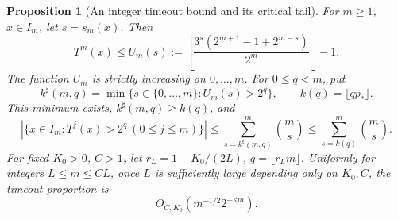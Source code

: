 \documentclass[11pt]{article}
\newtheorem{proposition}{Proposition}
\theoremstyle{remark}\newtheorem{remark}[proposition]{Remark}
\begin{document}
\begin{proposition}[An integer timeout bound and its critical tail]
\label{prop:shaik-timeout-tail}
For \(m\ge1\), \(x\in I_m\), let \(s=s_m(x)\). Then
\begin{equation}\label{eq:shaik-integer-affine}
 T^m(x)\le U_m(s):=
 \left\lfloor\frac{3^s(2^{m+1}-1+2^{m-s})}{2^m}\right\rfloor-1.
\end{equation}
The function \(U_m\) is strictly increasing on \(0,\ldots,m\).
For \(0\le q<m\), put
\[
 k^\sharp(m,q)=\min\{s\in\{0,\ldots,m\}:U_m(s)>2^q\},\qquad
 k(q)=\lfloor qp_*\rfloor .
\]
This minimum exists, \(k^\sharp(m,q)\ge k(q)\), and
\begin{equation}\label{eq:shaik-timeout-finite}
 |\{x\in I_m:T^j(x)>2^q\ (0\le j\le m)\}|
 \le\sum_{s=k^\sharp(m,q)}^m\binom ms
 \le\sum_{s=k(q)}^m\binom ms .
\end{equation}
For fixed \(K_0>0\), \(C>1\), let
\(r_L=1-K_0/(2L)\), \(q=\lfloor r_Lm\rfloor\).
Uniformly for integers \(L\le m\le CL\), once \(L\) is sufficiently
large depending only on \(K_0,C\), the timeout proportion is
\begin{equation}\label{eq:shaik-timeout-critical}
 O_{C,K_0}(m^{-1/2}2^{-\kappa m}).
\end{equation}
\end{proposition}
\end{document}
